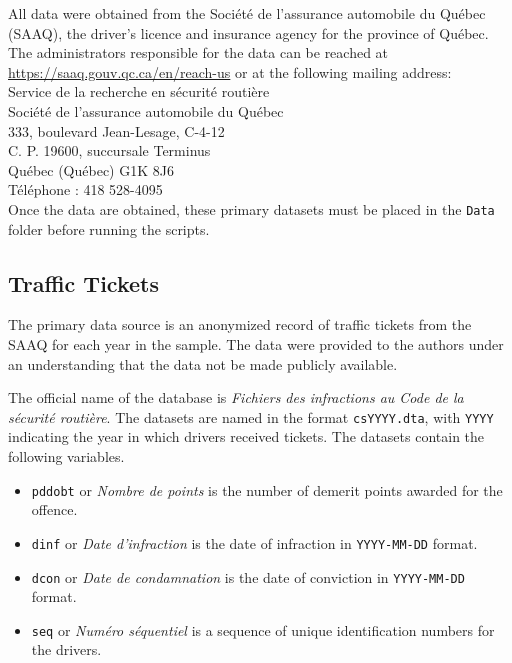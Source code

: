 \documentclass[11pt]{paper}
\begin{document}
All data were obtained from the 
Soci\'{e}t\'{e} de l'assurance automobile du Qu\'{e}bec (SAAQ), 
the driver's licence and insurance agency 
for the province of Qu\'{e}bec. 
The administrators responsible for the data can be reached at
\url{https://saaq.gouv.qc.ca/en/reach-us}
or at the following mailing address: \\
 
\noindent
Service de la recherche en s\'{e}curit\'{e} routi\`{e}re \\
Soci\'{e}t\'{e} de l'assurance automobile du Qu\'{e}bec \\
333, boulevard Jean-Lesage, C-4-12 \\
C. P. 19600, succursale Terminus \\
Qu\'{e}bec (Qu\'{e}bec) G1K 8J6 \\
T\'{e}l\'{e}phone : 418 528-4095 \\

Once the data are obtained, 
these primary datasets must be placed in the \texttt{Data}
folder before running the scripts.


\subsection*{Traffic Tickets}

The primary data source is an anonymized record of traffic tickets from the SAAQ for each year in the sample. 
The data were provided to the authors under an understanding
that the data not be made publicly available. 

The official name of the database is 
\emph{Fichiers des infractions au Code de la s\'{e}curit\'{e} routi\`{e}re}. 
The datasets are named in the format \texttt{csYYYY.dta}, 
with \texttt{YYYY} indicating the year in which drivers received tickets. 
The datasets contain the following variables.

\begin{itemize}

\item \texttt{pddobt} 
or \emph{Nombre de points} 
is the number of demerit points awarded for the offence.
\item \texttt{dinf} 
or \emph{Date d'infraction}
is the date of infraction in \texttt{YYYY-MM-DD} format.
\item \texttt{dcon}
or \emph{Date de condamnation} 
is the date of conviction in \texttt{YYYY-MM-DD} format.
\item \texttt{seq} 
or \emph{Num\'{e}ro s\'{e}quentiel} 
is a sequence of unique identification numbers for the drivers.

\end{itemize}
\end{document}
